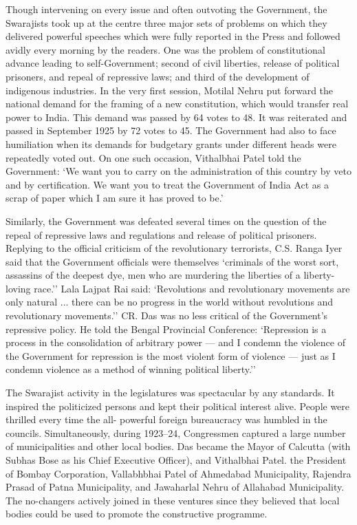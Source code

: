 \begin{multicols}{2}
Though intervening on every issue and often outvoting the Government, the Swarajists took up at the centre three major sets of problems on which they delivered powerful speeches which were fully reported in the Press and followed avidly every morning by the readers. One was the problem of constitutional advance leading to self-Government; second of civil liberties, release of political prisoners, and repeal of repressive laws; and third of the development of indigenous industries. In the very first session, Motilal Nehru put forward the national demand for the framing of a new constitution, which would transfer real power to India. This demand was passed by 64 votes to 48. It was reiterated and passed in September 1925 by 72 votes to 45. The Government had also to face humiliation when its demands for budgetary grants under different heads were repeatedly voted out. On one such occasion, Vithalbhai Patel told the Government: `We want you to carry on the administration of this country by veto and by certification. We want you to treat the Government of India Act as a scrap of paper which I am sure it has proved to be.'

Similarly, the Government was defeated several times on the question of the repeal of repressive laws and regulations and release of political prisoners. Replying to the official criticism of the revolutionary terrorists, C.S. Ranga Iyer said that the Government officials were themselves `criminals of the worst sort, assassins of the deepest dye, men who are murdering the liberties of a liberty-loving race.'' Lala Lajpat Rai said: `Revolutions and revolutionary movements are only natural ... there can be no progress in the world without revolutions and revolutionary movements.'' CR. Das was no less critical of the Government's repressive policy. He told the Bengal Provincial Conference: `Repression is a process in the consolidation of arbitrary power --- and I condemn the violence of the Government for repression is the most violent form of violence --- just as I condemn violence as a method of winning political liberty.''

The Swarajist activity in the legislatures was spectacular by any standards. It inspired the politicized persons and kept their political interest alive. People were thrilled every time the all- powerful foreign bureaucracy was humbled in the councils. Simultaneously, during 1923--24, Congressmen captured a large number of municipalities and other local bodies. Das became the Mayor of Calcutta (with Subhas Bose as his Chief Executive Officer), and Vithalbhai Patel. the President of Bombay Corporation, Vallabhbhai Patel of Ahmedabad Municipality, Rajendra Prasad of Patna Municipality, and Jawaharlal Nehru of Allahabad Municipality. The no-changers actively joined in these ventures since they believed that local bodies could be used to promote the constructive programme.


\end{multicols}
